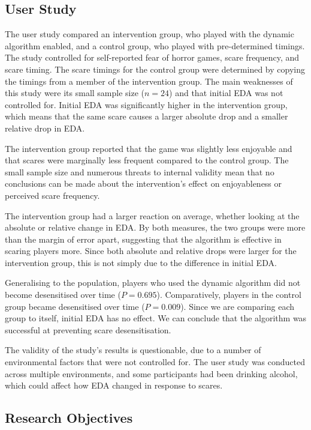 \documentclass[12pt,a4paper]{article}\usepackage[]{graphicx}\usepackage[]{color}
\begin{document}
\subsection{User Study}

The user study compared an intervention group, who played with the dynamic algorithm enabled, and a control group, who played with pre-determined timings.
The study controlled for self-reported fear of horror games, scare frequency, and scare timing.
The scare timings for the control group were determined by copying the timings from a member of the intervention group.
The main weaknesses of this study were its small sample size ($n=24$) and that initial EDA was not controlled for.
Initial EDA was significantly higher in the intervention group, which means that the same scare causes a larger absolute drop and a smaller relative drop in EDA.

The intervention group reported that the game was slightly less enjoyable and that scares were marginally less frequent compared to the control group.
The small sample size and numerous threats to internal validity mean that no conclusions can be made about the intervention's effect on enjoyableness or perceived scare frequency.

The intervention group had a larger reaction on average, whether looking at the absolute or relative change in EDA.
By both measures, the two groups were more than the margin of error apart, suggesting that the algorithm is effective in scaring players more.
Since both absolute and relative drops were larger for the intervention group, this is not simply due to the difference in initial EDA.

Generalising to the population, players who used the dynamic algorithm did not become desensitised over time ($P = 0.695$).
Comparatively, players in the control group became desensitised over time ($P = 0.009$).
Since we are comparing each group to itself, initial EDA has no effect.
We can conclude that the algorithm was successful at preventing scare desensitisation.

The validity of the study's results is questionable, due to a number of environmental factors that were not controlled for.
The user study was conducted across multiple environments, and some participants had been drinking alcohol, which could affect how EDA changed in response to scares.

\subsection{Research Objectives}
\end{document}
